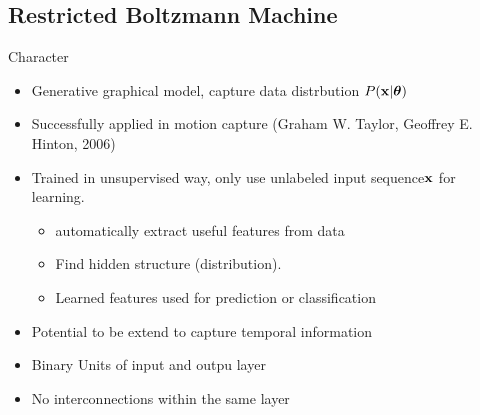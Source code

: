    \subsection{Restricted Boltzmann Machine}
	\begin{frame}[t]{Character}
	 \begin{itemize}
	  \item Generative graphical model, capture data distrbution $P(\mathbf{x}|\boldsymbol{\theta})$
	  \item Successfully applied in motion capture (Graham W. Taylor, Geoffrey E. Hinton, 2006)
	  \item Trained in unsupervised way, only use unlabeled input sequence$\mathbf{x}$ for learning. 
		  \begin{itemize}
		   \item automatically extract useful features from data 
		   \item Find hidden structure (distribution). 
		   \item Learned features used for prediction or classification
		  \end{itemize}
	  \item Potential to be extend to capture temporal information
	  \item Binary Units of input and outpu layer
	  \item No interconnections within the same layer
	 \end{itemize}


	

	\end{frame}
	
